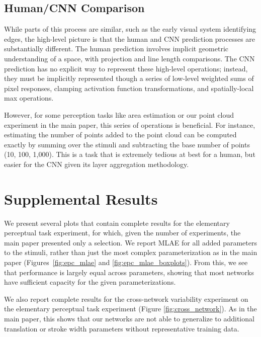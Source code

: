 \documentclass[journal]{vgtc}        %
\begin{document}
{\subsection{Human/CNN Comparison}
While parts of this process are similar, such as the early visual system identifying edges, the high-level picture is that the human and CNN prediction processes are substantially different. The human prediction involves implicit geometric understanding of a space, with projection and line length comparisons. The CNN prediction has no explicit way to represent these high-level operations; instead, they must be implicitly represented though a series of low-level weighted sums of pixel responses, clamping activation function transformations, and spatially-local max operations. 

However, for some perception tasks like area estimation or our point cloud experiment in the main paper, this series of operations is beneficial. For instance, estimating the number of points added to the point cloud can be computed exactly by summing over the stimuli and subtracting the base number of points (10, 100, 1,000). This is a task that is extremely tedious at best for a human, but easier for the CNN given its layer aggregation methodology.
}

\section{Supplemental Results}

We present several plots that contain complete results for the elementary perceptual task experiment, for which, given the number of experiments, the main paper presented only a selection. We report MLAE for all added parameters to the stimuli, rather than just the most complex parameterization as in the main paper (Figures~\ref{fig:epc_mlae} and \ref{fig:epc_mlae_boxplots}). From this, we see that performance is largely equal across parameters, showing that most networks have sufficient capacity for the given parameterizations.

We also report complete results for the cross-network variability experiment on the elementary perceptual task experiment (Figure \ref{fig:cross_network}). As in the main paper, this shows that our networks are not able to generalize to additional translation or stroke width parameters without representative training data.
\end{document}
